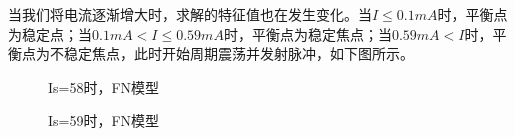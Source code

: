 \documentclass[12pt, a4paper, oneside]{ctexbook}
\begin{document}
当我们将电流逐渐增大时，求解的特征值也在发生变化。当$I\leqslant0.1mA$时，平衡点为稳定点；当$0.1mA<I\leqslant0.59mA$时，平衡点为稳定焦点；当$0.59mA<I$时，平衡点为不稳定焦点，此时开始周期震荡并发射脉冲，如下图所示。

\begin{figure}[H]
    \centering
    \caption{Is=58时，FN模型}
\end{figure}

\begin{figure}[H]
    \centering
    \caption{Is=59时，FN模型}
\end{figure}
\end{document}
